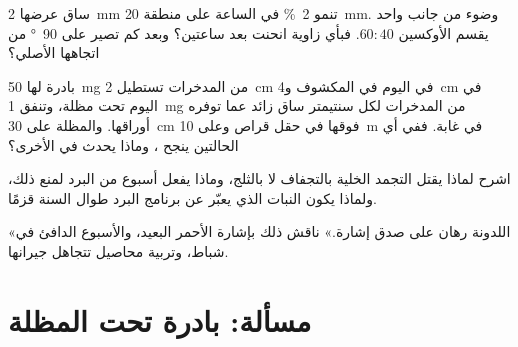 \begin{exercise}[$\star\star$]\label{exo:b2:plant-plasticity:9}
ساق عرضها \qty{2}{mm} تنمو \qty{2}{\%} في الساعة على
منطقة \qty{20}{mm}. وضوء من جانب واحد يقسم الأوكسين $60 : 40$.
فبأي زاوية انحنت بعد ساعتين؟ وبعد كم تصير
على \qty{90}{\degree} من اتجاهها الأصلي؟
\end{exercise}

\begin{exercise}[$\star\star\star$]\label{exo:b2:plant-plasticity:10}
بادرة لها \qty{50}{mg} من المدخرات تستطيل \qty{2}{cm}
في اليوم في المكشوف و\qty{4}{cm} في اليوم تحت مظلة، وتنفق
\qty{1}{mg} من المدخرات لكل سنتيمتر ساق زائد عما توفره
أوراقها. والمظلة على \qty{30}{cm} فوقها في حقل قراص
وعلى \qty{10}{m} في غابة. ففي أي الحالتين ينجح ،
وماذا يحدث في الأخرى؟
\end{exercise}

\begin{exercise}[$\star\star\star$]\label{exo:b2:plant-plasticity:11}
اشرح لماذا يقتل التجمد الخلية بالتجفاف لا بالثلج،
وماذا يفعل أسبوع من البرد لمنع ذلك، ولماذا يكون النبات الذي
يعبّر عن برنامج البرد طوال السنة قزمًا.
\end{exercise}

\begin{exercise}[$\star\star\star$]\label{exo:b2:plant-plasticity:12}
«اللدونة رهان على صدق إشارة.» ناقش ذلك بإشارة
الأحمر البعيد، والأسبوع الدافئ في شباط، وتربية محاصيل
تتجاهل جيرانها.
\end{exercise}

\section{مسألة: بادرة تحت المظلة}

